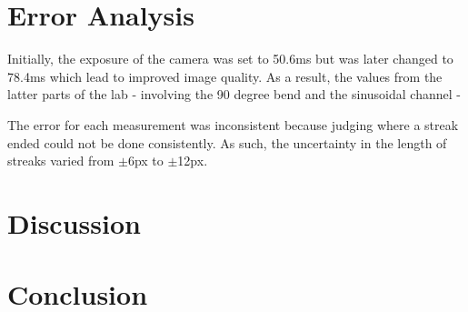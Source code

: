 \documentclass[11pt]{article}
\begin{document}
    \section{Error Analysis}
    Initially, the exposure of the camera was set to 50.6ms but was later changed to 78.4ms which lead to improved image quality. As a result, the values from the latter parts of the lab - involving the 90 degree bend and the sinusoidal channel - 

    The error for each measurement was inconsistent because judging where a streak ended could not be done consistently. As such, the uncertainty in the length of streaks varied from  $\pm$6px to $\pm$12px. 
    \section{Discussion}

    \section{Conclusion}
       


    
    
\end{document}
